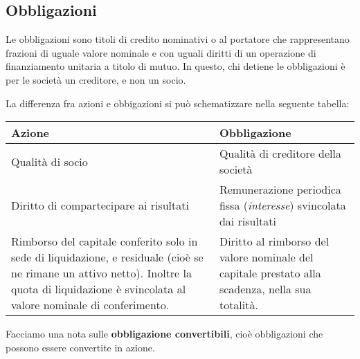 \documentclass[a4paper,11pt]{article}
\begin{document}
\subsection{Obbligazioni}
Le obbligazioni sono titoli di credito nominativi o al portatore che rappresentano frazioni di uguale valore nominale e con uguali diritti di un operazione di finanziamento unitaria a titolo di mutuo.
In questo, chi detiene le obbligazioni è per le società un creditore, e non un socio.

\par\medskip

La differenza fra azioni e obbigazioni si può schematizzare nella seguente tabella:

\begin{table}[H]
	\center {}
	\begin{tabular} {p{7cm} | p{7cm}}
		\bfseries Azione & \bfseries Obbligazione \\
		\hline 
		Qualità di socio & Qualità di creditore della società \\
		Diritto di compartecipare ai risultati & Remunerazione periodica fissa (\textit{interesse}) svincolata dai risultati \\
		Rimborso del capitale conferito solo in sede di liquidazione, e residuale (cioè se ne rimane un attivo netto). Inoltre la quota di liquidazione è svincolata al valore nominale di conferimento. & Diritto al rimborso del valore nominale del capitale prestato alla scadenza, nella sua totalità. \\
	\end{tabular}
\end{table}

Facciamo una nota sulle \textbf{obbligazione convertibili}, cioè obbligazioni che possono essere convertite in azione.
\end{document}
